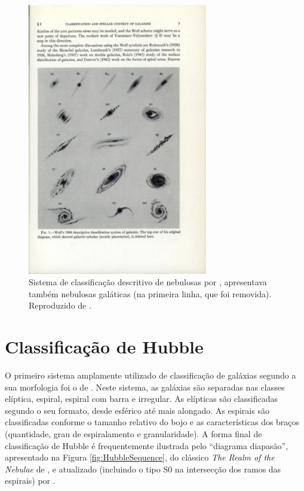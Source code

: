 \begin{figure}
	\includegraphics[width=0.7\textwidth]{figuras/WolfEarlyClass}
	\caption[Classificação de Wolf.]
	{Sistema de classificação descritivo de nebulosas por \citet{Wolf1908},
	apresentava também nebulosas galáticas (na primeira linha, que foi removida).
	Reproduzido de \citet{Sandage1975}.}
	\label{fig:WolfEarlyClass}
\end{figure}



\section{Classificação de Hubble}

O primeiro sistema amplamente utilizado de classificação de galáxias segundo a
sua morfologia foi o de \citet{Hubble1926}. Neste sistema, as galáxias são
separadas nas classes elíptica, espiral, espiral com barra e irregular. As
elípticas são classificadas segundo o seu formato, desde esférico até mais
alongado. As espirais são classificadas conforme o tamanho relativo do bojo e as
características dos braços (quantidade, grau de espiralamento e granularidade).
A forma final de classificação de Hubble é frequentemente ilustrada pelo
``diagrama diapasão'', apresentado na Figura \ref{fig:HubbleSequence}, do
clássico {\em The Realm of the Nebulae} de \citet{hubble1936}, e atualizado
(incluindo o tipo S0 na intersecção dos ramos das espirais) por
\citet{Sandage1975}.

